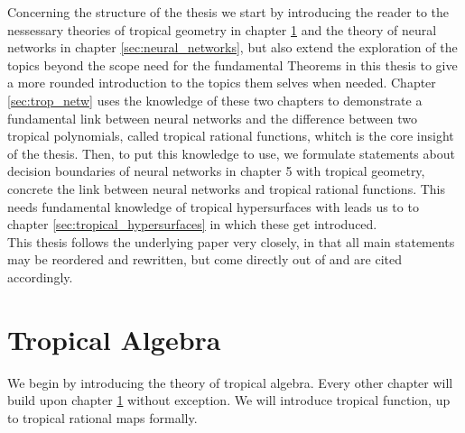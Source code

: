 \documentclass{article}
\theoremstyle{definition}
\begin{document}
Concerning the structure of the thesis we start by introducing the reader to the nessessary theories of tropical geometry in chapter \ref{sec:trop_algebra} and the theory of neural networks in chapter \ref{sec:neural_networks}, but also extend the exploration of the topics beyond the scope need for the fundamental Theorems in this thesis to give a more rounded introduction to the topics them selves when needed. Chapter \ref{sec:trop_netw} uses the knowledge of these two chapters to demonstrate a fundamental link between neural networks and the difference between two tropical polynomials, called tropical rational functions, whitch is the core insight of the thesis.
Then, to put this knowledge to use, we formulate statements about decision boundaries of neural networks in chapter  5 with tropical geometry, concrete the link between neural networks and tropical rational functions. This needs fundamental knowledge of tropical hypersurfaces with leads us to to chapter \ref{sec:tropical_hypersurfaces} in which these get introduced. \\

This thesis follows the underlying paper \cite{maclagan2015introduction} very closely, in that all main statements may be reordered and rewritten, but come directly out of \cite{maclagan2015introduction} and are cited accordingly.

\newpage

\section{Tropical Algebra}
\label{sec:trop_algebra}
We begin by introducing the theory of tropical algebra. Every other chapter will build upon chapter \ref{sec:trop_algebra} without exception. We will introduce tropical function, up to tropical rational maps formally. \\
\end{document}
